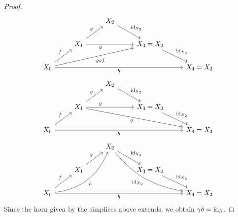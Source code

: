 \begin{proof}
\[	\begin{tikzcd}
		&& 
		X_2 
		\ar[rd, " \id_{ X_2 } "]
		\\
		&
		X_1
		\ar[rr, " g "' pos = 0.3]
		\ar[ru, "g"]
		&&
		X_3 = X_2
		\ar[rd, " \id_{X_2} "]
		\\
		X_0 
		\ar[ru, " f "]
		\ar[rrrr, " h "']
		\ar[rrru, "g \circ f"']
		&&&&
		X_4 = X_2
	\end{tikzcd}
	\]
	\[
	\begin{tikzcd}
		&& 
		X_2 
		\ar[rd, " \id_{ X_2 } "]
		\\
		&
		X_1
		\ar[rr, " g " pos = 0.3]
		\ar[ru, "g"]
		\ar[rrrd, "g "']
		&&
		X_3 = X_2
		\ar[rd, " \id_{X_2} "]
		\\
		X_0 
		\ar[ru, " f "]
		\ar[rrrr, " h "']
		&&&&
		X_4 = X_2
	\end{tikzcd}
	\]
	\[
	\begin{tikzcd}
		&& 
		X_2 
		\ar[rd, " \id_{ X_2 } "]
		\ar[rrdd, bend right = 20, " \id_{ X_2 } "']
		\\
		&
		X_1
		\ar[ru, "g"]
		&&
		X_3 = X_2
		\ar[rd, " \id_{X_2} "]
		\\
		X_0 
		\ar[rruu, bend right, "h"']
		\ar[ru, " f "]
		\ar[rrrr, " h "']
		&&&&
		X_4 = X_2
	\end{tikzcd}
	\]
	Since the horn given by the simplices above extends, we obtain $\gamma \delta = \operatorname{id}_h $. 
\end{proof}